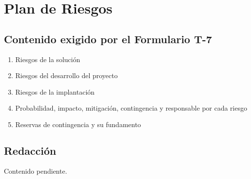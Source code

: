 \section{Plan de Riesgos}

%

\subsection{Contenido exigido por el Formulario T-7}

\begin{enumerate}
    \item Riesgos de la solución
    \item Riesgos del desarrollo del proyecto
    \item Riesgos de la implantación
    \item Probabilidad, impacto, mitigación, contingencia y responsable por cada riesgo
    \item Reservas de contingencia y su fundamento
\end{enumerate}

\subsection{Redacción}

Contenido pendiente.
